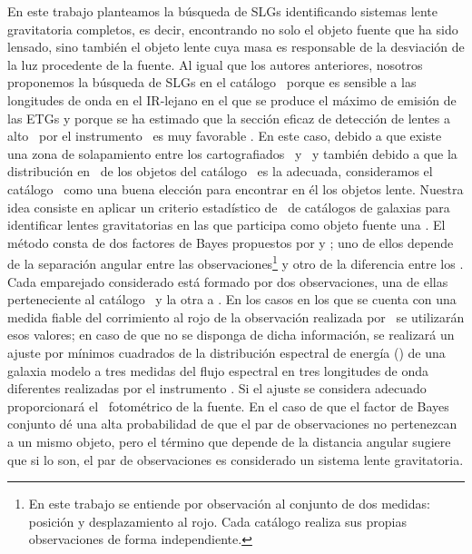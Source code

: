 En este trabajo planteamos la búsqueda de SLGs  identificando sistemas lente gravitatoria completos, es decir, encontrando no solo el objeto fuente que ha sido lensado, sino también el objeto lente cuya masa es responsable de la desviación de la luz procedente de la fuente. Al igual que los autores anteriores, nosotros proponemos la búsqueda de SLGs en el catálogo \hatlas\ porque es sensible a las longitudes de onda en el IR-lejano en el que se produce el máximo de emisión de las ETGs y porque se ha estimado que la sección eficaz de detección de lentes a alto \rt\ por el instrumento \spire\ es muy favorable \citep{article:Negrello_2010}. En este caso, debido a que existe una zona de solapamiento entre los cartografiados \hatlas\ y \gama\ y también debido a que la distribución en \rt\ de los objetos del catálogo \gama\ es la adecuada, consideramos el catálogo \gama\ como una buena elección para encontrar en él los objetos lente. Nuestra idea consiste en aplicar un criterio estadístico de \cross\ de catálogos de galaxias para identificar lentes gravitatorias en las que participa como objeto fuente una \etg. El método consta de dos factores de Bayes propuestos por \cite{article:Tamas_Budavari_2008} y  \cite{article:Tamas_Budavari_2011}; uno de ellos depende de la separación angular entre las observaciones\footnote{En este trabajo se entiende por observación al conjunto de dos medidas: posición y desplazamiento al rojo. Cada catálogo realiza sus propias observaciones de forma independiente.} y otro de la diferencia entre los \rt. Cada emparejado considerado está formado por dos observaciones, una de ellas perteneciente al catálogo \hatlas\ y la otra a \gama. En los casos en los que se cuenta con una medida fiable del corrimiento al rojo de la observación realizada por \hatlas\ se utilizarán esos valores; en caso de que no se disponga de dicha información, se realizará un ajuste por mínimos cuadrados de la distribución espectral de energía (\sed) de una galaxia modelo a tres medidas del flujo espectral en tres longitudes de onda diferentes realizadas por el instrumento \spire. Si el ajuste se considera adecuado proporcionará el \rt\ fotométrico de la fuente. En el caso de que el factor de Bayes conjunto dé una alta probabilidad de que el par de observaciones no pertenezcan a un mismo objeto, pero el término que depende de la distancia angular sugiere que si lo son, el par de observaciones es considerado un sistema lente gravitatoria.

